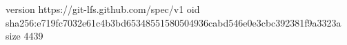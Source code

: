 version https://git-lfs.github.com/spec/v1
oid sha256:e719fc7032e61c4b3bd65348551580504936cabd546e0e3cbc392381f9a3323a
size 4439
